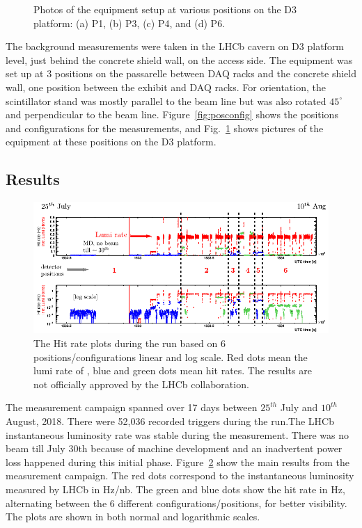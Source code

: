 \begin{figure}
{}
\caption{\label{fig:det_equip}
    Photos of the equipment setup at various positions on the D3 platform: (a) P1, (b) P3, (c) P4, and (d) P6.
}
\end{figure}

The background measurements were taken in the LHCb cavern on D3 platform level, just behind the concrete shield wall, on the access side. The equipment was set up at 3 positions on the passarelle between DAQ racks and the concrete shield wall, one position between the \delphi exhibit and DAQ racks. For orientation, the scintillator stand was mostly parallel to the beam line but was also rotated $45^{\circ}$ and perpendicular to the beam line. Figure~\ref{fig:posconfig} shows the positions and configurations for the measurements, and Fig.~\ref{fig:det_equip} shows pictures of the equipment at these positions on the D3 platform.


\subsection{Results}

\begin{figure}
\centering
    \includegraphics[width=16cm]{figs/INT/codexb_data_global.pdf}
\caption{\label{fig:results} The Hit rate plots during the run based on 6 positions/configurations linear and log scale. Red dots mean the lumi rate of \lhcb, blue and green dots mean hit rates. The results are not officially approved by the LHCb collaboration.
}
\end{figure}

The measurement campaign spanned over 17 days between $25^{th}$ July and $10^{th}$ August, 2018. There were 52,036 recorded triggers during the run.The LHCb instantaneous luminosity rate was stable during the measurement. There was no beam till July 30th because of machine development and an inadvertent power loss happened during this initial phase. Figure~\ref{fig:results} show the main results from the measurement campaign. The red dots correspond to the instantaneous luminosity measured by LHCb in Hz/nb. The green and blue dots show the hit rate in Hz, alternating between the 6 different configurations/positions, for better visibility. The plots are shown in both normal and logarithmic scales.


